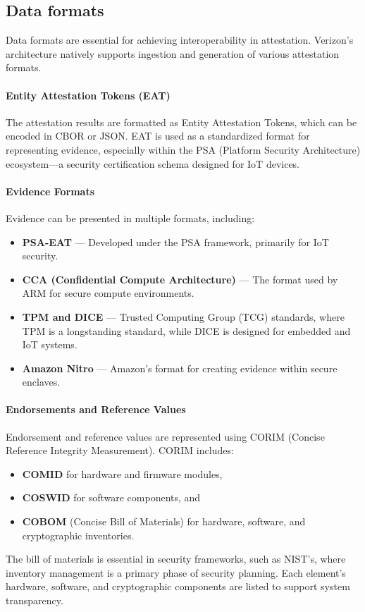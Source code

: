 \subsection{Data formats}

Data formats are essential for achieving interoperability in
attestation. Verizon’s architecture natively supports ingestion and
generation of various attestation formats.

\paragraph{Entity Attestation Tokens (EAT)}  
The attestation results are formatted as Entity Attestation Tokens,
which can be encoded in CBOR or JSON. EAT is used as a standardized
format for representing evidence, especially within the PSA (Platform
Security Architecture) ecosystem—a security certification schema
designed for IoT devices.

\paragraph{Evidence Formats}  
Evidence can be presented in multiple formats, including:
\begin{itemize}
    \item \textbf{PSA-EAT} — Developed under the PSA framework,
      primarily for IoT security.
    \item \textbf{CCA (Confidential Compute Architecture)} — The
      format used by ARM for secure compute environments.
    \item \textbf{TPM and DICE} — Trusted Computing Group (TCG)
      standards, where TPM is a longstanding standard, while DICE is
      designed for embedded and IoT systems.
    \item \textbf{Amazon Nitro} — Amazon’s format for creating
      evidence within secure enclaves.
\end{itemize}

\paragraph{Endorsements and Reference Values}  
Endorsement and reference values are represented using CORIM (Concise
Reference Integrity Measurement). CORIM includes:
\begin{itemize}
    \item \textbf{COMID} for hardware and firmware modules,
    \item \textbf{COSWID} for software components, and
    \item \textbf{COBOM} (Concise Bill of Materials) for hardware,
      software, and cryptographic inventories.
\end{itemize}
The bill of materials is essential in security frameworks, such as
NIST’s, where inventory management is a primary phase of security
planning. Each element's hardware, software, and cryptographic
components are listed to support system transparency.

